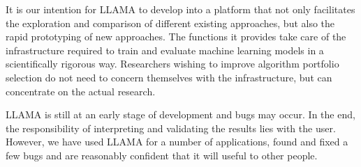 \documentclass{llncs}
\begin{document}
It is our intention for LLAMA to develop into a platform that not only
facilitates the exploration and comparison of different existing approaches, but
also the rapid prototyping of new approaches. The functions it provides take
care of the infrastructure required to train and evaluate machine learning
models in a scientifically rigorous way. Researchers wishing to improve
algorithm portfolio selection do not need to concern themselves with the
infrastructure, but can concentrate on the actual research.

LLAMA is still at an early stage of development and bugs may occur. In the end,
the responsibility of interpreting and validating the results lies with the
user. However, we have used LLAMA for a number of applications, found and fixed
a few bugs and are reasonably confident that it will useful to other people.



\end{document}
